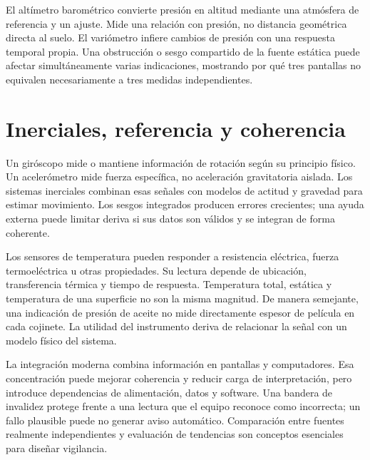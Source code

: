 El altímetro barométrico convierte presión en altitud mediante una atmósfera de referencia y un ajuste. Mide una relación con presión, no distancia geométrica directa al suelo. El variómetro infiere cambios de presión con una respuesta temporal propia. Una obstrucción o sesgo compartido de la fuente estática puede afectar simultáneamente varias indicaciones, mostrando por qué tres pantallas no equivalen necesariamente a tres medidas independientes.

\section{Inerciales, referencia y coherencia}
Un giróscopo mide o mantiene información de rotación según su principio físico. Un acelerómetro mide fuerza específica, no aceleración gravitatoria aislada. Los sistemas inerciales combinan esas señales con modelos de actitud y gravedad para estimar movimiento. Los sesgos integrados producen errores crecientes; una ayuda externa puede limitar deriva si sus datos son válidos y se integran de forma coherente.

Los sensores de temperatura pueden responder a resistencia eléctrica, fuerza termoeléctrica u otras propiedades. Su lectura depende de ubicación, transferencia térmica y tiempo de respuesta. Temperatura total, estática y temperatura de una superficie no son la misma magnitud. De manera semejante, una indicación de presión de aceite no mide directamente espesor de película en cada cojinete. La utilidad del instrumento deriva de relacionar la señal con un modelo físico del sistema.

La integración moderna combina información en pantallas y computadores. Esa concentración puede mejorar coherencia y reducir carga de interpretación, pero introduce dependencias de alimentación, datos y software. Una bandera de invalidez protege frente a una lectura que el equipo reconoce como incorrecta; un fallo plausible puede no generar aviso automático. Comparación entre fuentes realmente independientes y evaluación de tendencias son conceptos esenciales para diseñar vigilancia.

